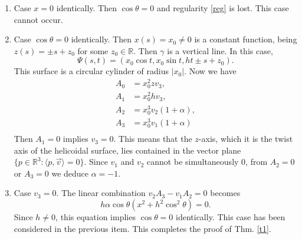 \documentclass[a4paper,12pt]{amsart}
\theoremstyle{definition}
\def\r{\mathbb R}
\begin{document}
\begin{enumerate}
\item Case  $x=0$ identically. Then $\cos\theta=0$ and regularity \eqref{reg} is lost. This case cannot occur. 
\item Case $\cos\theta=0$ identically. Then $x(s)=x_0\not=0$ is a constant function, being $z(s)=\pm s+z_0$ for some $z_0\in\r$. Then  $\gamma$ is a vertical line. In this case, 
$$\Psi(s,t)=(x_0 \cos t,x_0\sin t,ht\pm s+z_0).$$
This surface is a circular cylinder of radius $|x_0|$.  Now we have
\begin{equation*}
\begin{split}
A_0&=x_0^2z v_3, \\
A_1&=x_0^2h v_3,\\
A_2&=x_0^3v_2(1+\alpha),\\
A_3&= x_0^3v_1(1+\alpha)\\
\end{split}
\end{equation*}
Then $A_1=0$ implies $v_3=0$. This means that the $z$-axis, which it is the twist axis of the helicoidal surface, lies contained in the vector plane $\{p\in\r^3\colon\langle p,\vec{v}\rangle=0\}$. Since $v_1$ and $v_2$ cannot be simultaneously $0$, from $A_2=0$ or $A_3=0$ we deduce  $\alpha=-1$. 
\item Case $v_3=0$. The linear combination $v_2 A_3-v_1A_2=0$ becomes
$$h\alpha\cos\theta(x^2+h^2\cos^2\theta)=0.$$
Since $h\not=0$, this equation  implies $\cos\theta=0$ identically. This case has been   considered in the previous item. This completes the proof of Thm. \ref{t1}.
\end{enumerate}
\end{document}
